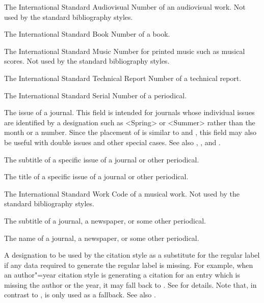 \documentclass{ltxdockit}[2011/03/25]
\begin{document}
\begin{fieldlist}

The International Standard Audiovisual Number of an audiovisual work. Not used by the standard bibliography styles.


The International Standard Book Number of a book.


The International Standard Music Number for printed music such as musical scores. Not used by the standard bibliography styles.


The International Standard Technical Report Number of a technical report.


The International Standard Serial Number of a periodical.


The issue of a journal. This field is intended for journals whose individual issues are identified by a designation such as <Spring> or <Summer> rather than the month or a number. Since the placement of  is similar to  and , this field may also be useful with double issues and other special cases. See also , , and .


The subtitle of a specific issue of a journal or other periodical.


The title of a specific issue of a journal or other periodical.


The International Standard Work Code of a musical work. Not used by the standard bibliography styles.


The subtitle of a journal, a newspaper, or some other periodical.


The name of a journal, a newspaper, or some other periodical.


A designation to be used by the citation style as a substitute for the regular label if any data required to generate the regular label is missing. For example, when an author"=year citation style is generating a citation for an entry which is missing the author or the year, it may fall back to . See  for details. Note that, in contrast to ,  is only used as a fallback. See also .


\end{fieldlist}
\end{document}
